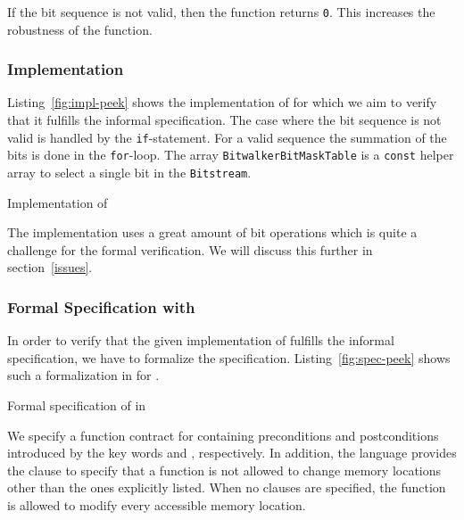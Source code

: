 If the bit sequence is not valid, then the function returns \texttt{0}.
This increases the robustness of the function.

\clearpage
\subsubsection{Implementation}
\label{impl-peek}
 
Listing~\ref{fig:impl-peek} shows the \isoc implementation of \peek 
for which we aim to verify that it fulfills the informal specification.
The case where the bit sequence is not valid is handled by the \texttt{if}-statement.
For a valid sequence the summation of the bits is done in the \texttt{for}-loop.
The array \texttt{BitwalkerBitMaskTable} is a \texttt{const} helper array 
to select a single bit in the \texttt{Bitstream}.

\begin{listing}[hbt]
\begin{minipage}{\textwidth}

\end{minipage}
\caption{\label{fig:impl-peek} Implementation of \peek}
\end{listing}

The implementation uses a great amount of bit operations
which is quite a challenge for the formal verification.
We will discuss this further in section~\ref{issues}.

\clearpage

\subsubsection{Formal Specification with \acsl}
\label{formal-peek}

In order to verify that the given implementation of \peek fulfills 
the informal specification, we have to formalize the specification.
Listing~\ref{fig:spec-peek} shows such a formalization in \acsl for \peek.

\begin{listing}[hbt]
\begin{minipage}{\textwidth}

\end{minipage}
\caption{\label{fig:spec-peek} Formal specification of \peek in \acsl}
\end{listing}

We specify a function contract for \peek containing preconditions
and postconditions introduced by the key words 
and , respectively.
In addition, the \acsl language provides the  clause to specify 
that a function is not allowed to change memory locations other than the ones 
explicitly listed. 
When no  clauses are specified, 
the function is allowed to modify every accessible memory location. 

